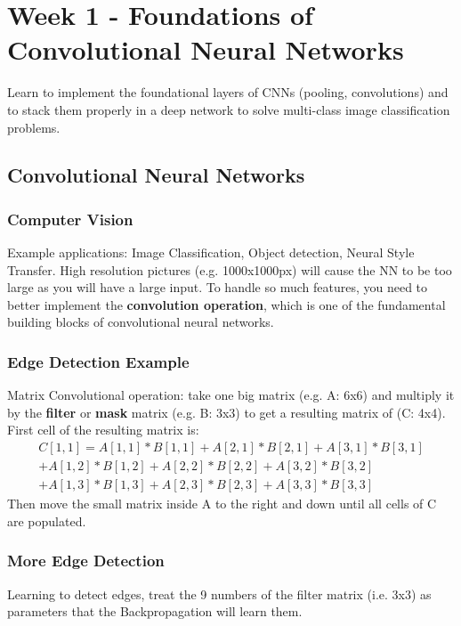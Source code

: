 \section{Week 1 - Foundations of Convolutional Neural Networks}
Learn to implement the foundational layers of CNNs (pooling, convolutions) and to stack them properly in a deep network to solve multi-class image classification problems.
\subsection{Convolutional Neural Networks}

\subsubsection{Computer Vision}
Example applications: Image Classification, Object detection, Neural Style Transfer.
High resolution pictures (e.g. 1000x1000px) will cause the NN to be too large as you will have a large input.  To handle so much features, you need to better implement the \textbf{convolution operation}, which is one of the fundamental building blocks of convolutional neural networks. 

\subsubsection{Edge Detection Example}
Matrix Convolutional operation: take one big matrix (e.g. A: 6x6) and multiply it by the \textbf{filter} or \textbf{mask} matrix (e.g. B: 3x3) to get a resulting matrix of (C: 4x4).
First cell of the resulting matrix is:
\begin{multline}
    C[1, 1] = A[1, 1] * B[1, 1] + A[2, 1] * B[2, 1] + A[3, 1] * B[3, 1] \\
    + A[1, 2] * B[1, 2] + A[2, 2] * B[2, 2] + A[3, 2] * B[3, 2] \\
    + A[1, 3] * B[1, 3] + A[2, 3] * B[2, 3] + A[3, 3] * B[3, 3]
\end{multline}
Then move the small matrix inside A to the right and down until all cells of C are populated.

\subsubsection{More Edge Detection}
Learning to detect edges, treat the 9 numbers of the filter matrix (i.e. 3x3) as parameters that the Backpropagation will learn them.

